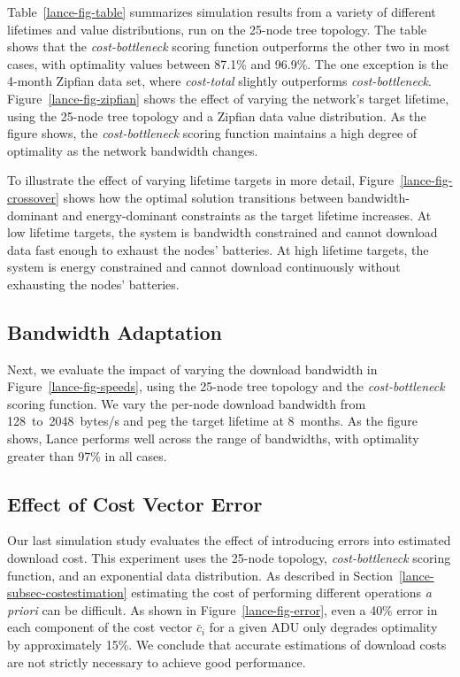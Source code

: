 Table~\ref{lance-fig-table} summarizes simulation results from a variety of
different lifetimes and value distributions, run on the 25-node tree
topology. The table shows that the \textit{cost-bottleneck} scoring function
outperforms the other two in most cases, with optimality values between
87.1\% and 96.9\%. The one exception is the 4-month Zipfian data set, where
\textit{cost-total} slightly outperforms \textit{cost-bottleneck}.
Figure~\ref{lance-fig-zipfian} shows the effect of varying the network's
target lifetime, using the 25-node tree topology and a Zipfian data value
distribution. As the figure shows, the \textit{cost-bottleneck} scoring
function maintains a high degree of optimality as the network bandwidth
changes.

To illustrate the effect of varying lifetime targets in more detail,
Figure~\ref{lance-fig-crossover} shows how the optimal solution transitions
between bandwidth-dominant and energy-dominant constraints as the target
lifetime increases. At low lifetime targets, the system is bandwidth
constrained and cannot download data fast enough to exhaust the nodes'
batteries. At high lifetime targets, the system is energy constrained and
cannot download continuously without exhausting the nodes' batteries.

\subsection{Bandwidth Adaptation}
\label{lance-sec-eval-params}

Next, we evaluate the impact of varying the download bandwidth in
Figure~\ref{lance-fig-speeds}, using the 25-node tree topology and the
\textit{cost-bottleneck} scoring function. We vary the per-node download
bandwidth from 128~to~2048~bytes/s and peg the target lifetime at 8~months.
As the figure shows, Lance performs well across the range of bandwidths, with
optimality greater than 97\% in all cases.

\subsection{Effect of Cost Vector Error}

Our last simulation study evaluates the effect of introducing errors into
estimated download cost. This experiment uses the 25-node topology,
\textit{cost-bottleneck} scoring function, and an exponential data
distribution. As described in Section~\ref{lance-subsec-costestimation}
estimating the cost of performing different operations \textit{a priori} can
be difficult. As shown in Figure~\ref{lance-fig-error}, even a 40\% error in
each component of the cost vector $\bar{c}_i$ for a given ADU only degrades
optimality by approximately 15\%. We conclude that accurate estimations of
download costs are not strictly necessary to achieve good performance.

